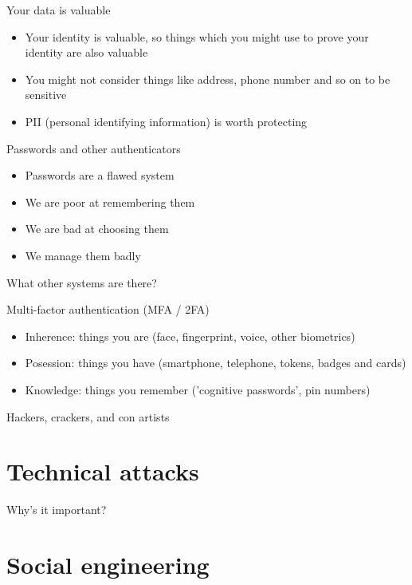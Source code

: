 \documentclass[xcolor=table]{beamer}
\begin{document}
\begin{frame}{Your data is valuable}
	\begin{itemize}
		\item Your identity is valuable, so things which you might use to prove your identity are also valuable
		\item You might not consider things like address, phone number and so on to be sensitive 
		\item PII (personal identifying information) is worth protecting
	\end{itemize}
\end{frame}
\begin{frame}{Passwords and other authenticators}
	\begin{itemize}
		\item Passwords are a flawed system
		\item We are poor at remembering them
		\item We are bad at choosing them
		\item We manage them badly
	\end{itemize}
	What other systems are there?
\end{frame}
\begin{frame}{Multi-factor authentication (MFA / 2FA)}
	\begin{itemize}
		\item Inherence: things you are (face, fingerprint, voice, other biometrics)
		\item Posession: things you have (smartphone, telephone, tokens, badges and cards)
		\item Knowledge: things you remember ('cognitive passwords', pin numbers)
	\end{itemize}
\end{frame}

\begin{frame}{Hackers, crackers, and con artists}
\end{frame}
\section{Technical attacks}

\begin{frame}{Why's it important?}

\end{frame}

\section{Social engineering }
\end{document}
